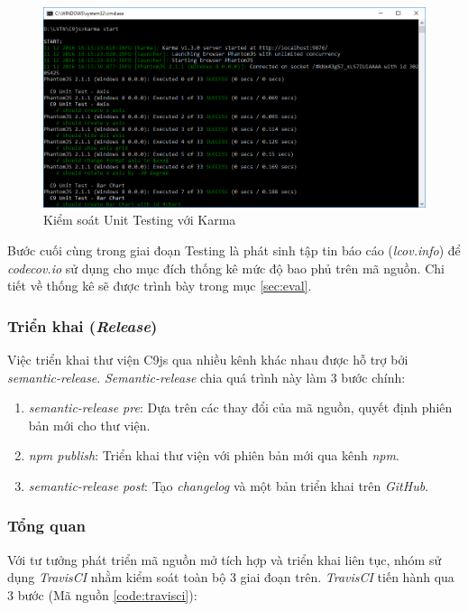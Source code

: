 \documentclass[12pt,a4paper,twoside]{article}
\begin{document}
\begin{figure}[!h]
	\begin{center}
    \includegraphics[scale=0.6]{image/karma_1}
    \caption{Kiểm soát Unit Testing với Karma}
    \label{fig:karma_1}
	\end{center}
\end{figure}

Bước cuối cùng trong giai đoạn Testing là phát sinh tập tin báo cáo (\textit{lcov.info}) để \textit{codecov.io} sử dụng cho mục đích thống kê mức độ bao phủ trên mã nguồn. Chi tiết về thống kê sẽ được trình bày trong mục \ref{sec:eval}.

\subsubsection{Triển khai (\textit{Release})}
Việc triển khai thư viện C9js qua nhiều kênh khác nhau được hỗ trợ bởi \textit{semantic-release}. \textit{Semantic-release} chia quá trình này làm 3 bước chính:

\begin{enumerate}
\item \emph{semantic-release pre}: Dựa trên các thay đổi của mã nguồn, quyết định phiên bản mới cho thư viện.
\item \emph{npm publish}: Triển khai thư viện với phiên bản mới qua kênh \textit{npm}.
\item \emph{semantic-release post}: Tạo \textit{changelog} và một bản triển khai trên \textit{GitHub}.
\end{enumerate}

\subsubsection*{Tổng quan}
Với tư tưởng phát triển mã nguồn mở tích hợp và triển khai liên tục, nhóm sử dụng \textit{TravisCI} nhằm kiểm soát toàn bộ 3 giai đoạn trên. \textit{TravisCI} tiến hành qua 3 bước (Mã nguồn \ref{code:travisci}):
\end{document}
